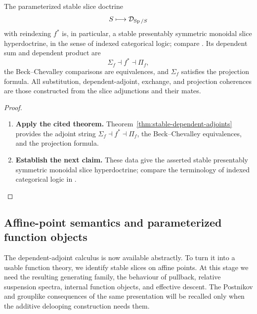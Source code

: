 \begin{corollary}
\label{cor:stable-linear-hyperdoctrine-recognition}
The parameterized stable slice doctrine
\[
  S\longmapsto\mathcal D_{\operatorname{Sp}/S}
\]
with reindexing \(f^*\) is, in particular, a stable presentably symmetric monoidal
slice hyperdoctrine, in the sense of indexed categorical logic; compare
\cite{JacobsCategoricalLogic}. Its dependent sum and dependent product are
\[
  \Sigma_f\dashv f^*\dashv\Pi_f,
\]
the Beck--Chevalley comparisons are equivalences, and \(\Sigma_f\) satisfies the
projection formula. All substitution, dependent-adjoint, exchange, and projection
coherences are those constructed from the slice adjunctions and their mates.
\end{corollary}

\begin{proof}
\leavevmode
\begin{enumerate}[label=\textup{(\arabic*)}]
    \item \textbf{Apply the cited theorem.}
    Theorem~\ref{thm:stable-dependent-adjoints} provides the adjoint string
    \(\Sigma_f\dashv f^*\dashv\Pi_f\), the Beck--Chevalley equivalences, and the
    projection formula.
    \item \textbf{Establish the next claim.}
    These data give the
    asserted stable presentably symmetric monoidal slice hyperdoctrine; compare the
    terminology of indexed categorical logic in \cite{JacobsCategoricalLogic}.
\end{enumerate}
\end{proof}

\subsection{Affine-point semantics and parameterized function objects}

The dependent-adjoint calculus is now available abstractly. To turn it into
a usable function theory, we identify stable slices on affine points. At this
stage we need the resulting generating family, the behaviour of pullback,
relative suspension spectra, internal function objects, and effective descent.
The Postnikov and grouplike consequences of the same presentation will be
recalled only when the additive delooping construction needs them.

